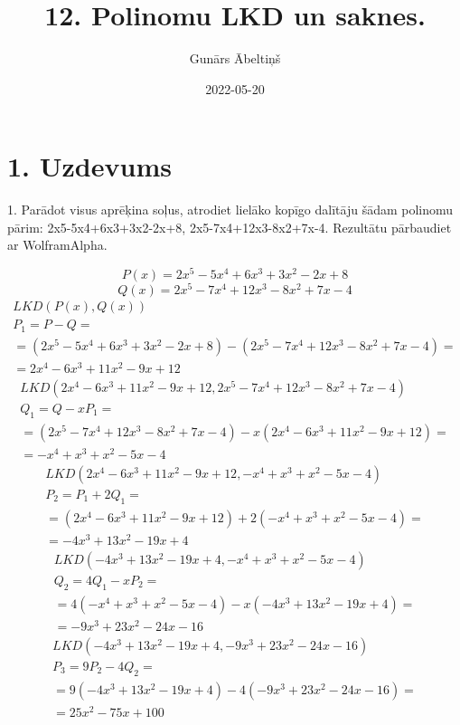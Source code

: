 \documentclass{article}
\title{12. Polinomu LKD un saknes.}
\author{Gunārs Ābeltiņš}
\date{2022-05-20}
\begin{document}
\maketitle

\section*{1. Uzdevums}
1. Parādot visus aprēķina soļus, atrodiet lielāko kopīgo dalītāju šādam polinomu pārim: 2x5-5x4+6x3+3x2-2x+8, 2x5-7x4+12x3-8x2+7x-4. Rezultātu pārbaudiet ar WolframAlpha.

\begin{equation*}
    P(x) = 2x^5-5x^4+6x^3+3x^2-2x+8
\end{equation*}
\begin{equation*}
    Q(x) = 2x^5-7x^4+12x^3-8x^2+7x-4
\end{equation*}
\begin{gather*}
    LKD(P(x), Q(x)) \\
    P_1 = P - Q = \\ = (2x^5-5x^4+6x^3+3x^2-2x+8) - (2x^5-7x^4+12x^3-8x^2+7x-4) = \\ = 2x^4-6x^3+11x^2-9x+12
\end{gather*}
\begin{gather*}
    LKD(2x^4-6x^3+11x^2-9x+12, 2x^5-7x^4+12x^3-8x^2+7x-4) \\
    Q_1 = Q - xP_1 = \\ = (2x^5-7x^4+12x^3-8x^2+7x-4) - x(2x^4-6x^3+11x^2-9x+12) = \\ = -x^4+x^3+x^2-5x-4
\end{gather*}
\begin{gather*}
    LKD(2x^4-6x^3+11x^2-9x+12, -x^4+x^3+x^2-5x-4) \\
    P_2 = P_1 + 2Q_1 = \\ = (2x^4-6x^3+11x^2-9x+12) + 2(-x^4+x^3+x^2-5x-4) = \\ = -4x^3+13x^2-19x+4
\end{gather*}
\begin{gather*}
    LKD(-4x^3+13x^2-19x+4, -x^4+x^3+x^2-5x-4) \\
    Q_2 = 4Q_1 - xP_2 = \\ = 4(-x^4+x^3+x^2-5x-4) - x(-4x^3+13x^2-19x+4) = \\ = -9x^3+23x^2-24x-16
\end{gather*}
\begin{gather*}
    LKD(-4x^3+13x^2-19x+4, -9x^3+23x^2-24x-16) \\
    P_3 = 9P_2 - 4Q_2 = \\ = 9(-4x^3+13x^2-19x+4) - 4(-9x^3+23x^2-24x-16) = \\ = 25x^2-75x+100
\end{gather*}
\end{document}
